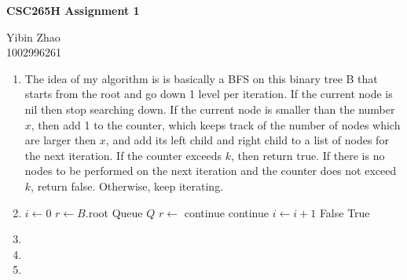 \documentclass[10pt]{article}
\begin{document}
\begin{center}
{\bf \Large \bf CSC265H Assignment 1}\\
\end{center}

\noindent
Yibin Zhao\\
1002996261\\


\begin{enumerate}

\item %
	The idea of my algorithm is is basically a BFS on this binary tree B that starts from the root and go down 1 level per iteration. If the current node is nil then stop searching down. If the current node is smaller than the number $x$, then add 1 to the counter, which keeps track of the number of nodes which are larger then $x$, and add its left child and right child to a list of nodes for the next iteration. If the counter exceeds $k$, then return true. If there is no nodes to be performed on the next iteration and the counter does not exceed $k$, return false. Otherwise, keep iterating.

\item %
\begin{algorithmic}[1]
		\State $i \gets 0$
		\State $r \gets B$.root
		\State Queue $Q$
		\State {}
			\State $r \gets$ 
				\State continue
			\Else	{}
				\State continue
			\Else
				\State {}
				\State {}
				\State $i \gets i+1$
				\EndIf
			\EndIf
		\EndWhile
			\State \Return False
		\Else
			\State \Return True
		\EndIf
	\EndFunction
\end{algorithmic}


\item %

\item %

\item %

\end{enumerate}
\end{document}
